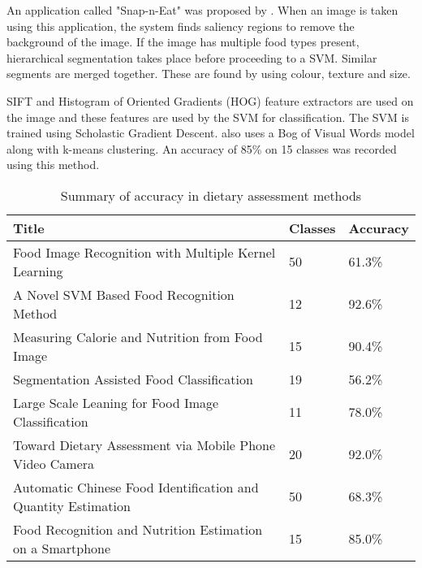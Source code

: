 An application called "Snap-n-Eat" was proposed by \parencite{snap}.
When an image is taken using this application, the system finds saliency regions to remove the background of the image.
If the image has multiple food types present, hierarchical segmentation takes place before proceeding to a SVM. Similar segments are merged together.
These are found by using colour, texture and size.

SIFT and Histogram of Oriented Gradients (HOG) feature extractors are used on the image and these features are used by the SVM for classification.
The SVM is trained using Scholastic Gradient Descent.
\parencite{snap} also uses a Bog of Visual Words model along with k-means clustering.
An accuracy of 85\% on 15 classes was recorded using this method.

\begin{table}[]
\centering
\caption{Summary of accuracy in dietary assessment methods}
\label{other_dietary_summary}
\begin{tabular}{|p{9cm}|l|l|}
\hline
\textbf{Title}                                                         & \textbf{Classes} & \textbf{Accuracy}   \\ \hline
Food Image Recognition with Multiple Kernel Learning          & 50             & 61.3\%    \\ \hline
A Novel SVM Based Food Recognition Method                     & 12             & 92.6\%     \\ \hline
Measuring Calorie and Nutrition from Food Image               & 15             & 90.4\%    \\ \hline
Segmentation Assisted Food Classification                     & 19            & 56.2\%     \\ \hline
Large Scale Leaning for Food Image Classification             & 11             & 78.0\%       \\ \hline
Toward Dietary Assessment via Mobile Phone Video Camera       & 20             & 92.0\% \\ \hline
Automatic Chinese Food Identification and Quantity Estimation & 50             & 68.3\%     \\ \hline
Food Recognition and Nutrition Estimation on a Smartphone      & 15             & 85.0\% \\ \hline      
\end{tabular}
\end{table}